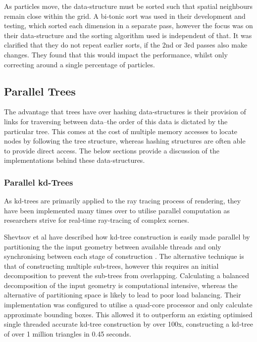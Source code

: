      As particles move, the data-structure must be sorted such that spatial neighbours remain close within the grid. A bi-tonic sort was used in their development and testing, which sorted each dimension in a separate pass, however the focus was on their data-structure and the sorting algorithm used is independent of that. It was clarified that they do not repeat earlier sorts, if the 2nd or 3rd passes also make changes. They found that this would impact the performance, whilst only correcting around a single percentage of particles.
    
      
      
  \subsection{Parallel Trees}
    The advantage that trees have over hashing data-structures is their provision of links for traversing between data--the order of this data is dictated by the particular tree. This comes at the cost of multiple memory accesses to locate nodes by following the tree structure, whereas hashing structures are often able to provide direct access. The below sections provide a discussion of the implementations behind these data-structures.

    \subsubsection*{Parallel kd-Trees}
      As kd-trees are primarily applied to the ray tracing process of rendering, they have been implemented many times over to utilise parallel computation as researchers strive for real-time ray-tracing of complex scenes. 
      
      Shevtsov et al have described how kd-tree construction is easily made parallel by  partitioning the the input geometry between available threads and only synchronising between each stage of construction \cite{SSK07}. The alternative technique is that of constructing multiple sub-trees, however this requires an initial decomposition to prevent the sub-trees from overlapping. Calculating a balanced decomposition of the input geometry is computational intensive, whereas the alternative of partitioning space is likely to lead to poor load balancing. Their implementation was configured to utilise a quad-core processor and only calculate approximate bounding boxes. This allowed it to outperform an existing optimised single threaded accurate kd-tree construction by over 100x, constructing a kd-tree of over 1 million triangles in 0.45 seconds.
      
